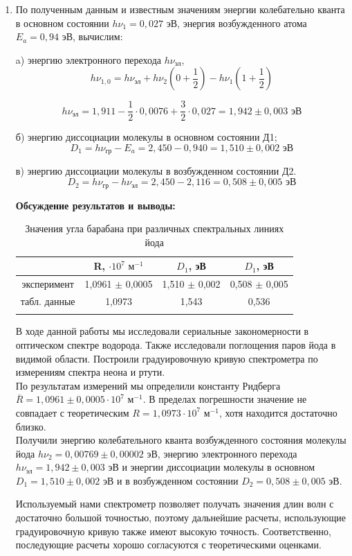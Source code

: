 \documentclass[a4paper, 12pt]{article}%
\begin{document}
\begin{enumerate}
		\item По полученным данным и известным значениям энергии колебательно кванта в основном состоянии $h\nu_1 = 0,027$ эВ, энергия возбужденного атома $E_a = 0,94$ эВ, вычислим:
		
		a) энергию электронного перехода $h \nu_{\text{эл}}$,\\
		$$h \nu_{1,0}=h \nu_{\text{эл}}+h\nu_2(0+\dfrac{1}{2})-h \nu_1(1+\dfrac{1}{2})$$
		
		$$ h \nu_{\text{эл}} = 1,911 -  \dfrac{1}{2}\cdot 0,0076 + \dfrac{3}{2}\cdot 0,027 = 1,942\pm  0,003\text{ эВ} $$
		
		б) энергию диссоциации молекулы в основном состоянии Д1;\\
		$$D_1 = h \nu_{\text{гр}} - E_a = 2,450 - 0,940 = 1,510 \pm  0,002\text{ эВ}$$
		
		
		в) энергию диссоциации молекулы в возбужденном состоянии Д2.\\
		$$D_2 = h \nu_{\text{гр}} - h \nu_{\text{эл}} = 2,450 - 2,116 = 0,508 \pm  0,005\text{ эВ}$$
		
		
		
		
		\textbf{Обсуждение результатов и выводы: }\\
		
		\begin{longtable}{|c|c|c|c|}
			\hline
			 & R, $\cdot 10^7 \text{ м}^{-1}$ & $D_1$, эВ &  $D_1$, эВ \\ \hline
			 эксперимент & 1,0961 $\pm$ 0,0005 & 1,510 $\pm$ 0,002 & 0,508 $\pm$ 0,005\\ \hline
			 табл. данные & 1,0973 & 1,543 & 0,536 \\ \hline
			\caption{Значения угла барабана при различных спектральных линиях йода}
		\end{longtable}
		
		В ходе данной работы мы исследовали сериальные закономерности в оптическом спектре водорода. Также исследовали поглощения паров йода в видимой области. Построили градуировочную кривую спектрометра по измерениям спектра неона и ртути.\\
		По результатам измерений мы определили константу Ридберга $\overline{R} = 1,0961 \pm 0,0005\cdot 10^7\text{ м}^{-1}$. В пределах погрешности значение не совпадает с теоретическим $ R = 1,0973\cdot 10^7\text{ м}^{-1}$, хотя находится достаточно близко.\\
		Получили энергию колебательного кванта возбужденного состояния молекулы йода $ h \nu_2 = 0,00769 \pm 0,00002 \text{ эВ}$, энергию электронного перехода  $h \nu_{\text{эл}} = 1,942 \pm 0,003 \text{ эВ}$ и энергии диссоциации молекулы в основном $D_1 = 1,510 \pm 0,002\text{ эВ}$ и в возбужденном состоянии $D_2 = 0,508 \pm 0,005\text{ эВ}$.
		
		Используемый нами спектрометр позволяет получать значения длин волн с достаточно большой точностью, поэтому дальнейшие расчеты, использующие градуировочную кривую также имеют высокую точность. Соответственно, последующие расчеты хорошо согласуются с теоретическими оценками. 
		
	
	
	
		

		
	\end{enumerate}
	
\end{document}
